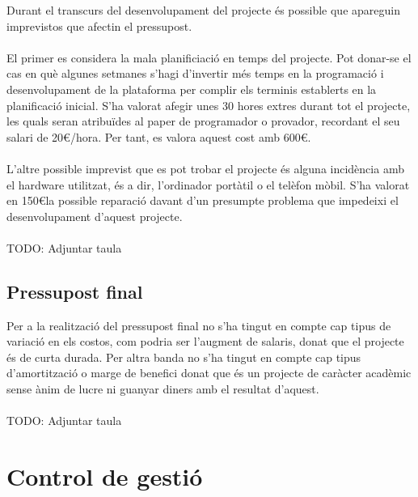 Durant el transcurs del desenvolupament del projecte és possible que apareguin imprevistos que afectin el pressupost.
\\\\
El primer es considera la mala planificiació en temps del projecte. Pot donar-se el cas en què algunes setmanes s’hagi d’invertir més temps en la programació i desenvolupament de la plataforma per complir els terminis establerts en la planificació inicial. S’ha valorat afegir unes 30 hores extres durant tot el projecte, les quals seran atribuïdes al paper de programador o provador, recordant el seu salari de 20\euro/hora. Per tant, es valora aquest cost amb 600\euro.
\\\\
L’altre possible imprevist que es pot trobar el projecte és alguna incidència amb el hardware utilitzat, és a dir, l’ordinador portàtil o el telèfon mòbil. S’ha valorat en 150\euro\space la possible reparació davant d’un presumpte problema que impedeixi el desenvolupament d’aquest projecte.
\\\\
TODO: Adjuntar taula

\subsection{Pressupost final}

Per a la realització del pressupost final no s’ha tingut en compte cap tipus de variació en els costos, com podria ser l’augment de salaris, donat que el projecte és de curta durada. Per altra banda no s’ha tingut en compte cap tipus d’amortització o marge de benefici donat que és un projecte de caràcter acadèmic sense ànim de lucre ni guanyar diners amb el resultat d’aquest.
\\\\
TODO: Adjuntar taula


\section{Control de gestió}


